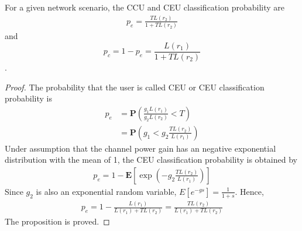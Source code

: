 \documentclass[10pt,a4paper]{amsart}
\begin{document}
\begin{proposition}
	For a given network scenario, the CCU and CEU classification probability are
	\begin{align}
		p_e = \frac{TL(r_2)}{1+TL(r_2)}
	\end{align}	
	and $$p_c = 1-p_e=\frac{L(r_1)}{1+TL(r_2)}$$.
\end{proposition}

\begin{proof}
	The probability that the user is called CEU or CEU classification probability is 
	\begin{align}
		p_e& = \mathbf{P}\left(\frac{g_1L(r_1)}{g_2L(r_2)}<T\right) \nonumber\\
		&= \mathbf{P}\left(g_1<g_2\frac{TL(r_2)}{L(r_1)}\right)
	\end{align}
	Under assumption that the channel power gain has an negative exponential distribution with the mean of 1, the CEU classification probability is obtained by
	\begin{align}
		p_e = 1-\mathbf{E}\left[\exp\left(-g_2\frac{TL(r_2)}{L(r_1)}\right)\right]
	\end{align}
	Since $g_2$ is also an exponential random variable, $E[e^{-gs}]=\frac{1}{1+s}$. Hence,
	\begin{align}
		p_e = 1-\frac{L(r_1)}{L(r_1)+TL(r_2)} = \frac{TL(r_2)}{L(r_1)+TL(r_2)}
	\end{align}	
	The proposition is proved.
\end{proof}
\end{document}
